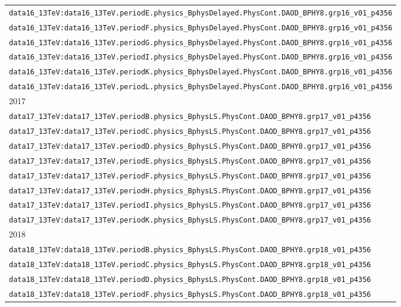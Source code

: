 \begin{table}[!hbp]
\begin{tabular}{|l|}
\verb|data16_13TeV:data16_13TeV.periodE.physics_BphysDelayed.PhysCont.DAOD_BPHY8.grp16_v01_p4356| \\
\verb|data16_13TeV:data16_13TeV.periodF.physics_BphysDelayed.PhysCont.DAOD_BPHY8.grp16_v01_p4356| \\
\verb|data16_13TeV:data16_13TeV.periodG.physics_BphysDelayed.PhysCont.DAOD_BPHY8.grp16_v01_p4356| \\
\verb|data16_13TeV:data16_13TeV.periodI.physics_BphysDelayed.PhysCont.DAOD_BPHY8.grp16_v01_p4356| \\
\verb|data16_13TeV:data16_13TeV.periodK.physics_BphysDelayed.PhysCont.DAOD_BPHY8.grp16_v01_p4356| \\
\verb|data16_13TeV:data16_13TeV.periodL.physics_BphysDelayed.PhysCont.DAOD_BPHY8.grp16_v01_p4356| \\
\hline 
2017 \\
\hline 
\verb|data17_13TeV:data17_13TeV.periodB.physics_BphysLS.PhysCont.DAOD_BPHY8.grp17_v01_p4356| \\
\verb|data17_13TeV:data17_13TeV.periodC.physics_BphysLS.PhysCont.DAOD_BPHY8.grp17_v01_p4356| \\
\verb|data17_13TeV:data17_13TeV.periodD.physics_BphysLS.PhysCont.DAOD_BPHY8.grp17_v01_p4356| \\
\verb|data17_13TeV:data17_13TeV.periodE.physics_BphysLS.PhysCont.DAOD_BPHY8.grp17_v01_p4356| \\
\verb|data17_13TeV:data17_13TeV.periodF.physics_BphysLS.PhysCont.DAOD_BPHY8.grp17_v01_p4356| \\
\verb|data17_13TeV:data17_13TeV.periodH.physics_BphysLS.PhysCont.DAOD_BPHY8.grp17_v01_p4356| \\
\verb|data17_13TeV:data17_13TeV.periodI.physics_BphysLS.PhysCont.DAOD_BPHY8.grp17_v01_p4356| \\
\verb|data17_13TeV:data17_13TeV.periodK.physics_BphysLS.PhysCont.DAOD_BPHY8.grp17_v01_p4356| \\
\hline 
2018 \\
\hline
\verb|data18_13TeV:data18_13TeV.periodB.physics_BphysLS.PhysCont.DAOD_BPHY8.grp18_v01_p4356| \\
\verb|data18_13TeV:data18_13TeV.periodC.physics_BphysLS.PhysCont.DAOD_BPHY8.grp18_v01_p4356| \\
\verb|data18_13TeV:data18_13TeV.periodD.physics_BphysLS.PhysCont.DAOD_BPHY8.grp18_v01_p4356| \\
\verb|data18_13TeV:data18_13TeV.periodF.physics_BphysLS.PhysCont.DAOD_BPHY8.grp18_v01_p4356| \\

\end{tabular}
\end{table}
